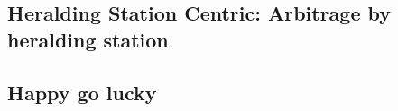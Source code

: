 \documentclass{article}
\begin{document}
\subsection{Heralding Station Centric: Arbitrage by heralding station}

\subsection{Happy go lucky}
\end{document}
